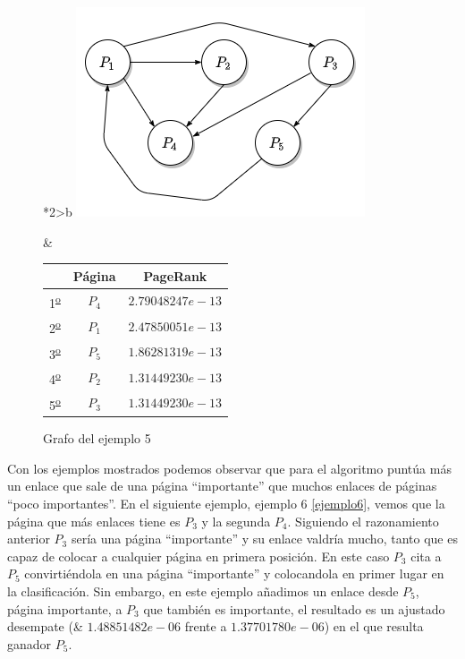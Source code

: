 \documentclass[size=a4, parskip=half, titlepage=false, toc=flat, toc=bib, 12pt, twoside]{scrartcl}
\theoremstyle{theorem-style}
\theoremstyle{definition-style}
\theoremstyle{remark-style}
\theoremstyle{example-style}
\theoremstyle{definition-style}
\theoremstyle{remark-style}
\begin{document}
\begin{figure}[!ht]
  \begin{tabular}{*{2}{>{\centering\arraybackslash}b{}}}
  \centering
    \includegraphics[scale=0.5]{./img/grafoej5}
    \caption{Grafo del ejemplo 5}
    \label{ejemplo5}
    &
      \renewcommand{\arraystretch}{1.3}
      \begin{tabular}{ccc}
        & Página & PageRank         \\ \hline
      1\textsuperscript{\underline{o}}} & $P_4$  & $2.79048247e-13$ \\ \hline
      2\textsuperscript{\underline{o}}} & $P_1$  & $2.47850051e-13$ \\ \hline
      3\textsuperscript{\underline{o}}} & $P_5$  & $1.86281319e-13$ \\ \hline
      4\textsuperscript{\underline{o}}} & $P_2$  & $1.31449230e-13$ \\ \hline
      5\textsuperscript{\underline{o}}} & $P_3$  & $1.31449230e-13$ \\ \hline
      \end{tabular}
    \end{tabular}
\end{figure}

Con los ejemplos mostrados podemos observar que para el algoritmo puntúa más un enlace que sale de una página ``importante'' que muchos enlaces de páginas ``poco importantes''. En el siguiente ejemplo, ejemplo 6 \ref{ejemplo6}, vemos que la página que más enlaces tiene es $P_3$ y la segunda $P_4$. Siguiendo el razonamiento anterior $P_3$ sería una página ``importante'' y su enlace valdría mucho, tanto que es capaz de colocar a cualquier página en primera posición. En este caso $P_3$ cita a $P_5$ convirtiéndola en una página ``importante'' y colocandola en primer lugar en la clasificación. Sin embargo, en este ejemplo añadimos un enlace desde $P_5$, página importante, a $P_3$ que también es importante, el resultado es un ajustado desempate (& $1.48851482e-06$ frente a $1.37701780e-06$) en el que resulta ganador $P_5$.
\end{document}
